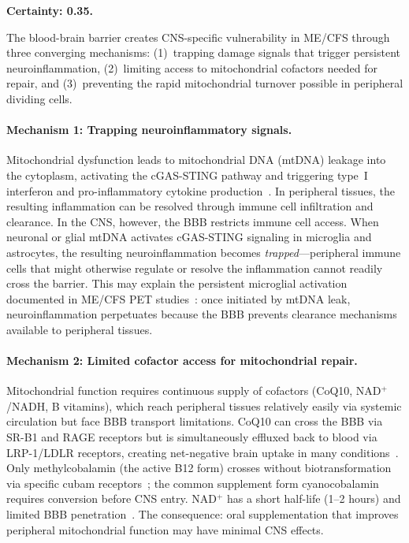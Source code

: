 \begin{speculation}
\label{spec:bbb-vulnerability}
\textbf{Certainty: 0.35.}

The blood-brain barrier creates CNS-specific vulnerability in ME/CFS through three converging mechanisms: (1)~trapping damage signals that trigger persistent neuroinflammation, (2)~limiting access to mitochondrial cofactors needed for repair, and (3)~preventing the rapid mitochondrial turnover possible in peripheral dividing cells.

\paragraph{Mechanism 1: Trapping neuroinflammatory signals.}
Mitochondrial dysfunction leads to mitochondrial DNA (mtDNA) leakage into the cytoplasm, activating the cGAS-STING pathway and triggering type~I interferon and pro-inflammatory cytokine production~\cite{mtDNA_cGAS_STING_2024}. In peripheral tissues, the resulting inflammation can be resolved through immune cell infiltration and clearance. In the CNS, however, the BBB restricts immune cell access. When neuronal or glial mtDNA activates cGAS-STING signaling in microglia and astrocytes, the resulting neuroinflammation becomes \emph{trapped}---peripheral immune cells that might otherwise regulate or resolve the inflammation cannot readily cross the barrier. This may explain the persistent microglial activation documented in ME/CFS PET studies~\cite{Nakatomi2014neuroinflammation}: once initiated by mtDNA leak, neuroinflammation perpetuates because the BBB prevents clearance mechanisms available to peripheral tissues.

\paragraph{Mechanism 2: Limited cofactor access for mitochondrial repair.}
Mitochondrial function requires continuous supply of cofactors (CoQ10, NAD$^+$/NADH, B vitamins), which reach peripheral tissues relatively easily via systemic circulation but face BBB transport limitations. CoQ10 can cross the BBB via SR-B1 and RAGE receptors but is simultaneously effluxed back to blood via LRP-1/LDLR receptors, creating net-negative brain uptake in many conditions~\cite{CoQ10_BBB_2025}. Only methylcobalamin (the active B12 form) crosses without biotransformation via specific cubam receptors~\cite{methylcobalamin_BBB_2024}; the common supplement form cyanocobalamin requires conversion before CNS entry. NAD$^+$ has a short half-life (1--2 hours) and limited BBB penetration~\cite{intranasal_NAD_2024}. The consequence: oral supplementation that improves peripheral mitochondrial function may have minimal CNS effects.


\end{speculation}
